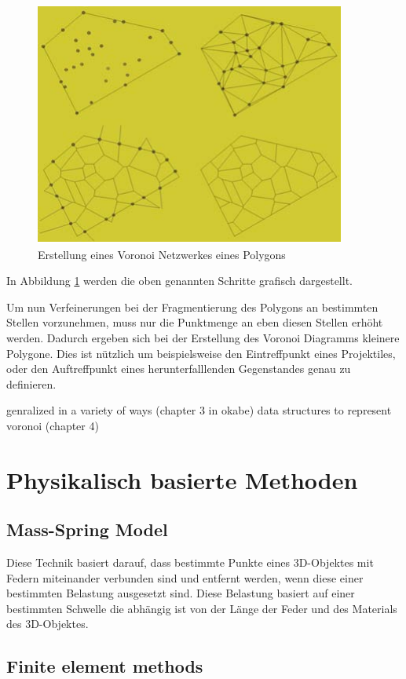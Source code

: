 \begin{figure}[H]
    \centering
    \includegraphics[width=0.5\linewidth]{PICs/voronoiSteps.PNG}
    \caption{Erstellung eines Voronoi Netzwerkes eines Polygons \protect\cite{Raghavachary.FractureGenerationOnPolygonalMeshes}}
    \label{fig:voronoi2}
\end{figure}

In Abbildung \ref{fig:voronoi2} werden die oben genannten Schritte grafisch dargestellt.

Um nun Verfeinerungen bei der Fragmentierung des Polygons an bestimmten Stellen vorzunehmen, muss nur die Punktmenge an eben diesen Stellen erhöht werden. Dadurch ergeben
sich bei der Erstellung des Voronoi Diagramms kleinere Polygone. Dies ist nützlich um beispielsweise den Eintreffpunkt eines Projektiles, oder 
den Auftreffpunkt eines herunterfalllenden Gegenstandes genau zu definieren. 




genralized in a variety of ways (chapter 3 in okabe)
data structures to represent voronoi (chapter 4)


\section{Physikalisch basierte Methoden}

\subsection{Mass-Spring Model}

Diese Technik basiert darauf, dass bestimmte Punkte eines 3D-Objektes mit Federn miteinander verbunden sind und entfernt werden, wenn diese einer bestimmten Belastung
ausgesetzt sind. Diese Belastung basiert auf einer bestimmten Schwelle die abhängig ist von der Länge der Feder und des Materials des 3D-Objektes. 

\subsection{Finite element methods}

